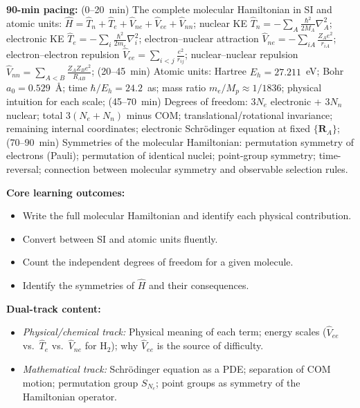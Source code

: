 \documentclass[11pt,a4paper]{article}
\begin{document}
\begin{tcolorbox}[chembox, title={Module~III.1 --- Lecture L01: The Molecular Hamiltonian}]
\textbf{90-min pacing:} (0--20~min) The complete molecular Hamiltonian in SI and atomic units: $\hat{H}=\hat{T}_n+\hat{T}_e+\hat{V}_{ne}+\hat{V}_{ee}+\hat{V}_{nn}$; nuclear KE $\hat{T}_n=-\sum_A\tfrac{\hbar^2}{2M_A}\nabla_A^2$; electronic KE $\hat{T}_e=-\sum_i\tfrac{\hbar^2}{2m_e}\nabla_i^2$; electron--nuclear attraction $\hat{V}_{ne}=-\sum_{iA}\tfrac{Z_Ae^2}{r_{iA}}$; electron--electron repulsion $\hat{V}_{ee}=\sum_{i<j}\tfrac{e^2}{r_{ij}}$; nuclear--nuclear repulsion $\hat{V}_{nn}=\sum_{A<B}\tfrac{Z_AZ_Be^2}{R_{AB}}$; (20--45~min) Atomic units: Hartree $E_h=27.211$~eV; Bohr $a_0=0.529$~\AA; time $\hbar/E_h=24.2$~as; mass ratio $m_e/M_p\approx1/1836$; physical intuition for each scale; (45--70~min) Degrees of freedom: $3N_e$ electronic + $3N_n$ nuclear; total $3(N_e+N_n)$ minus COM; translational/rotational invariance; remaining internal coordinates; electronic Schr\"odinger equation at fixed $\{\mathbf{R}_A\}$; (70--90~min) Symmetries of the molecular Hamiltonian: permutation symmetry of electrons (Pauli); permutation of identical nuclei; point-group symmetry; time-reversal; connection between molecular symmetry and observable selection rules.

\medskip\textbf{Core learning outcomes:}
\begin{itemize}[leftmargin=1.4em,topsep=2pt,itemsep=1pt]
  \item Write the full molecular Hamiltonian and identify each physical contribution.
  \item Convert between SI and atomic units fluently.
  \item Count the independent degrees of freedom for a given molecule.
  \item Identify the symmetries of $\hat{H}$ and their consequences.
\end{itemize}

\medskip\textbf{Dual-track content:}
\begin{itemize}[leftmargin=1.4em,topsep=2pt,itemsep=1pt]
  \item \textit{Physical/chemical track:} Physical meaning of each term; energy scales ($\hat{V}_{ee}$ vs.\ $\hat{T}_e$ vs.\ $\hat{V}_{ne}$ for H$_2$); why $\hat{V}_{ee}$ is the source of difficulty.
  \item \textit{Mathematical track:} Schr\"odinger equation as a PDE; separation of COM motion; permutation group $S_{N_e}$; point groups as symmetry of the Hamiltonian operator.
\end{itemize}


\end{tcolorbox}
\end{document}
